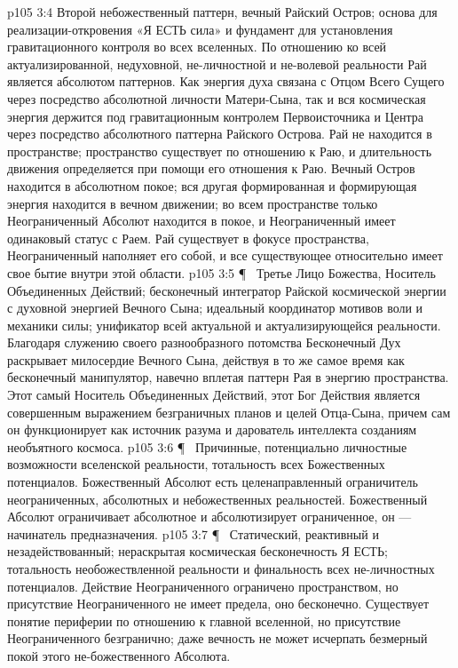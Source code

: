 \vs p105 3:4 \bibnobreakspace {} Второй небожественный паттерн, вечный Райский Остров; основа для реализации\hyp{}откровения «Я ЕСТЬ сила» и фундамент для установления гравитационного контроля во всех вселенных. По отношению ко всей актуализированной, недуховной, не\hyp{}личностной и не\hyp{}волевой реальности Рай является абсолютом паттернов. Как энергия духа связана с Отцом Всего Сущего через посредство абсолютной личности Матери\hyp{}Сына, так и вся космическая энергия держится под гравитационным контролем Первоисточника и Центра через посредство абсолютного паттерна Райского Острова. Рай не находится в пространстве; пространство существует по отношению к Раю, и длительность движения определяется при помощи его отношения к Раю. Вечный Остров находится в абсолютном покое; вся другая формированная и формирующая энергия находится в вечном движении; во всем пространстве только Неограниченный Абсолют находится в покое, и Неограниченный имеет одинаковый статус с Раем. Рай существует в фокусе пространства, Неограниченный наполняет его собой, и все существующее относительно имеет свое бытие внутри этой области.
\vs p105 3:5 \P\ \bibnobreakspace {} Третье Лицо Божества, Носитель Объединенных Действий; бесконечный интегратор Райской космической энергии с духовной энергией Вечного Сына; идеальный координатор мотивов воли и механики силы; унификатор всей актуальной и актуализирующейся реальности. Благодаря служению своего разнообразного потомства Бесконечный Дух раскрывает милосердие Вечного Сына, действуя в то же самое время как бесконечный манипулятор, навечно вплетая паттерн Рая в энергию пространства. Этот самый Носитель Объединенных Действий, этот Бог Действия является совершенным выражением безграничных планов и целей Отца\hyp{}Сына, причем сам он функционирует как источник разума и дарователь интеллекта созданиям необъятного космоса.
\vs p105 3:6 \P\ \bibnobreakspace {} Причинные, потенциально личностные возможности вселенской реальности, тотальность всех Божественных потенциалов. Божественный Абсолют есть целенаправленный ограничитель неограниченных, абсолютных и небожественных реальностей. Божественный Абсолют ограничивает абсолютное и абсолютизирует ограниченное, он --- начинатель предназначения.
\vs p105 3:7 \P\ \bibnobreakspace {} Статический, реактивный и незадействованный; нераскрытая космическая бесконечность Я ЕСТЬ; тотальность необожествленной реальности и финальность всех не\hyp{}личностных потенциалов. Действие Неограниченного ограничено пространством, но присутствие Неограниченного не имеет предела, оно бесконечно. Существует понятие периферии по отношению к главной вселенной, но присутствие Неограниченного безгранично; даже вечность не может исчерпать безмерный покой этого не\hyp{}божественного Абсолюта.
